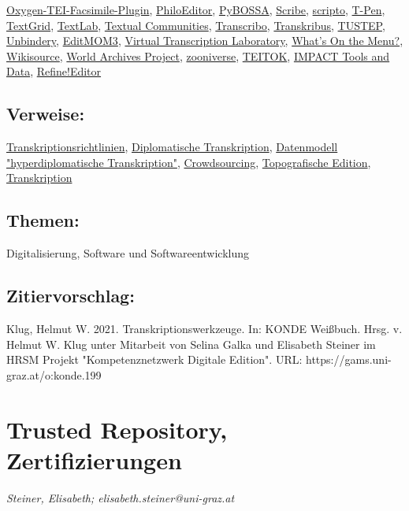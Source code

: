 \documentclass{article}
\begin{document}
\href{https://github.com/oxygenxml/TEI-Facsimile-Plugin}{Oxygen-TEI-Facsimile-Plugin}, \href{http://www.fabiovitali.it/filologia/}{PhiloEditor}, \href{http://pybossa.com/}{PyBOSSA}, \href{http://github.com/zooniverse/Scribe}{Scribe}, \href{http://scripto.org/}{scripto}, \href{http://t-pen.org/TPEN/}{T-Pen}, \href{https://textgrid.de/}{TextGrid}, \href{https://www.textlab.org/about/}{TextLab}, \href{https://textualcommunities.org/app/}{Textual Communities}, \href{http://transcribo.org/en/}{Transcribo}, \href{https://transkribus.eu/Transkribus/}{Transkribus}, \href{http://www.tustep.uni-tuebingen.de/}{TUSTEP}, \href{http://bencrowder.net/coding/unbindery/}{Unbindery}, \href{https://docs.google.com/document/d/1QsFodbmuOld4ZAmnURR2tKewE1tgRo1cGxpaIUy92Mw/edit}{EditMOM3}, \href{http://wlt.synat.pcss.pl/}{Virtual Transcription Laboratory}, \href{http://menus.nypl.org/}{What's On the Menu?}, \href{http://en.wikisource.org/wiki/Main_Page}{Wikisource}, \href{http://community.ancestry.co.uk/awap}{World Archives Project}, \href{https://www.zooniverse.org/}{zooniverse}, \href{http://www.teitok.org/index.php?action=about}{TEITOK}, \href{https://www.digitisation.eu}{IMPACT Tools and Data}, \href{https://3pc.de/}{Refine!Editor}\subsection*{Verweise:}\href{https://gams.uni-graz.at/o:konde.198}{Transkriptionsrichtlinien}, \href{https://gams.uni-graz.at/o:konde.66}{Diplomatische Transkription}, \href{https://gams.uni-graz.at/o:konde.50}{Datenmodell "hyperdiplomatische Transkription"}, \href{https://gams.uni-graz.at/o:konde.47}{Crowdsourcing}, \href{https://gams.uni-graz.at/o:konde.196}{Topografische Edition}, \href{https://gams.uni-graz.at/o:konde.197}{Transkription}\subsection*{Themen:}Digitalisierung, Software und Softwareentwicklung\subsection*{Zitiervorschlag:}Klug, Helmut W. 2021. Transkriptionswerkzeuge. In: KONDE Weißbuch. Hrsg. v. Helmut W. Klug unter Mitarbeit von Selina Galka und Elisabeth Steiner im HRSM Projekt "Kompetenznetzwerk Digitale Edition". URL: https://gams.uni-graz.at/o:konde.199\newpage\section*{Trusted Repository, Zertifizierungen} \emph{Steiner, Elisabeth; elisabeth.steiner@uni-graz.at}\\
        
\end{document}

